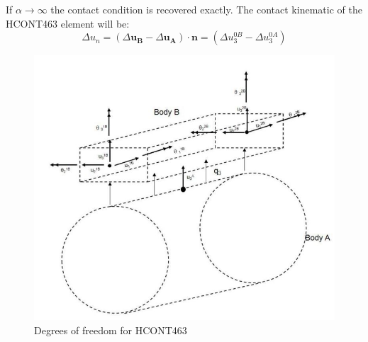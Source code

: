 If $\alpha \rightarrow \infty$ the contact condition is recovered exactly.\newline
\newline 
\noindent The contact kinematic of the HCONT463 element will be:
\begin{equation}
    \Delta u_n= (\Delta \boldsymbol{u_B} - \Delta \boldsymbol{u_A})  \cdot \boldsymbol{n} = (\Delta u_3^{0B} - \Delta u_3^{0A})
\end{equation}
\begin{figure}[H]
\centering
\includegraphics[scale=0.8]{figures/hcont463}
\caption[$\; \:$HCONT463]{Degrees of freedom for HCONT463\cite{Bflextheory2013} }
 \label{fig:HCONT463}
\end{figure}

